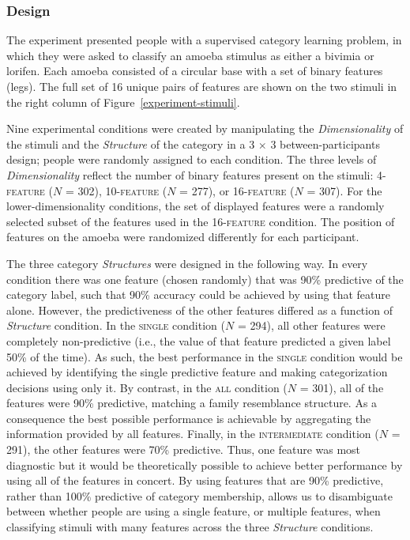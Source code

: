 \documentclass[a4paper, doc, floatsintext]{apa6}
\begin{document}
\subsubsection{Design}

The experiment presented people with a supervised category learning problem, in which they were asked to classify an amoeba stimulus as either a \textsf{bivimia} or \textsf{lorifen}. Each amoeba consisted of a circular base with a set of binary features (legs). The full set of 16 unique pairs of features are shown on the two stimuli in the right column of Figure~\ref{experiment-stimuli}.

Nine experimental conditions were created by manipulating the \textit{Dimensionality} of the stimuli and the \textit{Structure} of the category in a 3 $\times$ 3 between-participants design; people were randomly assigned to each condition. The three levels of \textit{Dimensionality} reflect the number of binary features present on the stimuli: 4-\textsc{feature} ($N$ = 302), 10-\textsc{feature} ($N$ = 277), or 16-\textsc{feature} ($N$ = 307). For the lower-dimensionality conditions, the set of displayed features were a randomly selected subset of the features used in the 16-\textsc{feature} condition. The position of features on the amoeba were randomized differently for each participant.

The three category \textit{Structures} were designed in the following way. In every condition there was one feature (chosen randomly) that was 90\% predictive of the category label, such that 90\% accuracy could be achieved by using that feature alone. However, the predictiveness of the other features differed as a function of \textit{Structure} condition. In the \textsc{single} condition ($N$ = 294), all other features were completely non-predictive (i.e., the value of that feature predicted a given label 50\% of the time). As such, the best performance in the \textsc{single} condition would be achieved by identifying the single predictive feature and making categorization decisions using only it. By contrast, in the \textsc{all} condition ($N$ = 301), all of the features were 90\% predictive, matching a family resemblance structure. As a consequence the best possible performance is achievable by aggregating the information provided by all features. Finally, in the \textsc{intermediate} condition ($N$ = 291), the other features were 70\% predictive. Thus, one feature was most diagnostic but it would be theoretically possible to achieve better performance by using all of the features in concert. By using features that are 90\% predictive, rather than 100\% predictive of category membership, allows us to disambiguate between whether people are using a single feature, or multiple features, when classifying stimuli with many features across the three \textit{Structure} conditions.
\end{document}
